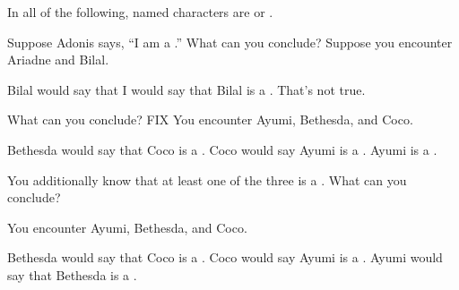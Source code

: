 \probsec{~\ref{sec:knights-knaves}}

  In all of the following, named characters are \knights or \knaves.
\vspace{.1in}
\begin{ExerciseList}
  \problem Suppose Adonis says, ``I am a \knight.'' What can you conclude?
  \problem Suppose you encounter Ariadne and Bilal.
  \begin{dialogue}
     Bilal would say that I would say that Bilal is a \knight.
     That's not true.
  \end{dialogue}
  What can you conclude? FIX
  \problem You encounter Ayumi, Bethesda, and Coco.
  \begin{dialogue}
     Bethesda would say that Coco is a \knave.
     Coco would say Ayumi is a \knave.
     Ayumi is a \knight.
  \end{dialogue} 
  You additionally know that at least one of the three is a \knave. What can you conclude?

  \problem You encounter Ayumi, Bethesda, and Coco.
  \begin{dialogue}
     Bethesda would say that Coco is a \knave.
     Coco would say Ayumi is a \knave.
     Ayumi would say that Bethesda is a \knave.
  \end{dialogue} 
\end{ExerciseList}

